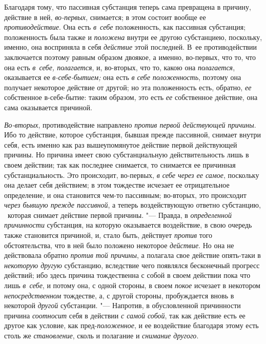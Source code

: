 Благодаря тому, что пассивная субстанция теперь сама превращена в причину,
действие в ней, {\em во-первых}, снимается; в этом
состоит вообще ее {\em противодействие}. Она есть
{\em в~себе} положенность, как пассивная субстанция;
положенность была также и {\em положена} внутри ее
другою субстанциею, поскольку, именно, она восприняла в себя
{\em действие} этой последней. В~ее противодействии
заключается поэтому равным образом двоякое, а именно, во-первых, что то,
что она есть {\em в~себе, полагается}, и, во-вторых, что то, какою она
{\em полагается}, оказывается ее {\em в-себе-бытием;} она есть
{\em в себе положенность}, поэтому она получает
некоторое действие от другой; но эта положенность есть, обратно,
{\em ее} собственное в-себе-бытие: таким образом, это
есть {\em ее} собственное действие, она сама оказывается причиной.

{\em Во-вторых}, противодействие направлено
{\em против первой действующей причины}. Ибо то
действие, которое субстанция, бывшая прежде пассивной, снимает внутри себя,
есть именно как раз вышеупомянутое действие первой действующей причины. Но
причина имеет свою субстанциальную действительность лишь в своем действии;
так как последнее снимается, то снимается ее причинная субстанциальность.
Это происходит, во-первых, {\em в себе через ее самое},
поскольку она делает себя действием; в этом тождестве исчезает ее
отрицательное определение, и она становится чем-то пассивным; во-вторых,
это происходит {\em через бывшую прежде пассивной}, а
теперь воздействующую ответно субстанцию, \ которая снимает действие первой
причины. "--- Правда, в {\em определенной причинности}
субстанция, на которую оказывается воздействие, в свою очередь также
становится причиной, и, стало быть, действует
{\em против} того обстоятельства, что в ней было
положено некоторое {\em действие}. Но она не
действовала обратно {\em против той причины}, а
полагала свое действие опять-таки в {\em некоторую
другую} субстанцию, вследствие чего появлялся бесконечный прогресс
действий; ибо здесь причина тождественна с собой в своем действии пока что
лишь {\em в~себе}, и потому она, с одной стороны, в
своем {\em покое} исчезает в некотором
{\em непосредственном} тождестве, а, с другой стороны,
пробуждается вновь в некоторой {\em другой} субстанции.
"--- Напротив, в обусловленной причинности причина
{\em соотносит} себя в действии
{\em с самой собой}, так как действие есть ее другое
как условие, как пред-{\em положенное}, и ее
воздействие благодаря этому есть столь же
{\em становление}, сколь и полагание и {\em снимание другого}.

